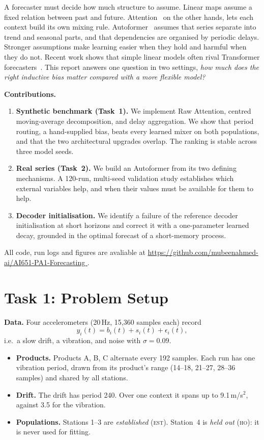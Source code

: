 \documentclass[11pt,a4paper]{article}
\newcommand{\est}{\textsc{est}}   %
\newcommand{\ho}{\textsc{ho}}     %
\begin{document}
\noindent A forecaster must decide how much structure to assume. Linear maps assume a fixed relation between past and future. Attention~\cite{vaswani2017} on the other hands, lets each context build its own mixing rule. Autoformer~\cite{wu2021} assumes that series separate into trend and seasonal parts, and that dependencies are organised by periodic delays. Stronger assumptions make learning easier when they hold and harmful when they do not. Recent work shows that simple linear models often rival Transformer forecasters~\cite{zeng2023}. This report answers one question in two settings, \emph{how much does the right inductive bias matter compared with a more flexible model?}

\textbf{Contributions.}
\begin{enumerate}
  \item \textbf{Synthetic benchmark (Task~1).} We implement Raw Attention, centred moving-average decomposition, and delay aggregation. We show that period routing, a hand-supplied bias, beats every learned mixer on both populations, and that the two architectural upgrades overlap. The ranking is stable across three model seeds.
  \item \textbf{Real series (Task~2).} We build an Autoformer from its two defining mechanisms. A 120-run, multi-seed validation study establishes which external variables help, and when their values must be available for them to help.
  \item \textbf{Decoder initialisation.} We identify a failure of the reference decoder initialisation at short horizons and correct it with a one-parameter learned decay, grounded in the optimal forecast of a short-memory process.
\end{enumerate}
All code, run logs and figures are avaliable at  \hyperlink{Git-repo}{https://github.com/mubeenahmed-ai/AI651-PA1-Forecasting }.


\section{Task 1: Problem Setup}
\textbf{Data.} Four accelerometers (20\,Hz, 15{,}360 samples each) record
\[
y_i(t)=b_i(t)+s_i(t)+\epsilon_i(t),
\]
i.e.\ a slow drift, a vibration, and noise with $\sigma=0.09$.
\begin{itemize}
  \item \textbf{Products.} Products A, B, C alternate every 192 samples. Each run has one vibration period, drawn from its product's range (14--18, 21--27, 28--36 samples) and shared by all stations.
  \item \textbf{Drift.} The drift has period 240. Over one context it spans up to 9.1\,m/s$^2$, against 3.5 for the vibration.
  \item \textbf{Populations.} Stations 1--3 are \emph{established} (\est). Station~4 is \emph{held out} (\ho): it is never used for fitting.
\end{itemize}
\end{document}
